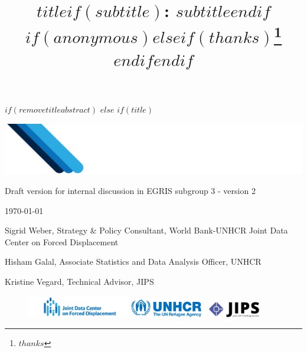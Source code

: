\documentclass[$if(fontsize)$$fontsize$,$endif$$if(lang)$$babel-lang$,$endif$$if(papersize)$$papersize$,$endif$$for(classoption)$$classoption$$sep$,$endfor$]{article}
\title{$title$$if(subtitle)$: $subtitle$$endif$ $if(anonymous)$$else$$if(thanks)$\thanks{$thanks$} $endif$$endif$ }
\date{}
\begin{document}
	

$if(removetitleabstract)$
$else$
$if(title)$

{
\thispagestyle{empty}
\vspace*{-3cm}
\hspace*{-2.5cm}\includegraphics{design/JDC_banner.png}
\vspace*{3cm}
\linebreak

\begin{center}

\vspace*{1.5cm}

Draft version for internal discussion in EGRIS subgroup 3 - version 2

\bigskip
\today

\vspace*{1.5cm}

\footnotesize
Sigrid Weber, Strategy \& Policy Consultant, World Bank-UNHCR Joint Data Center on Forced Displacement


Hisham Galal, Associate Statistics and Data Analysis Officer, UNHCR 

Kristine Vegard, Technical Advisor, JIPS

\vfill
\normalsize

\end{center}


\begin{figure}[h]       
    \mbox{\includegraphics[width=0.4\textwidth]{design/JDC.png}}   
    \hspace{10px}
    \mbox{\includegraphics[width=0.3\textwidth]{design/unhcr.png}}
    \hspace{16px}
    \mbox{\includegraphics[width=0.2\textwidth]{design/jips.png}}
\end{figure}

}
\end{document}

